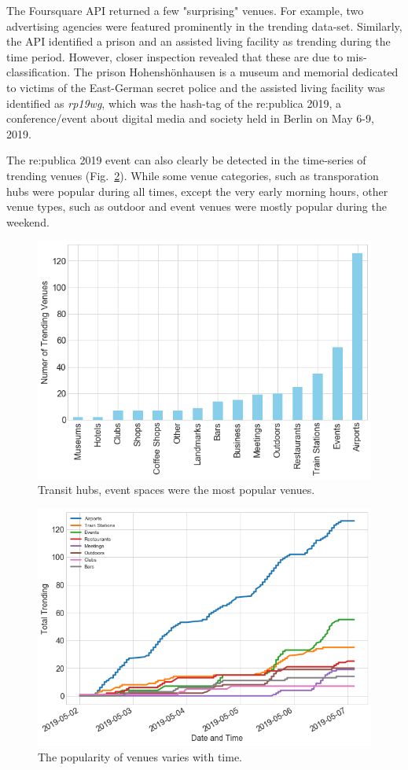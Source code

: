 \documentclass[letter]{scrartcl}
\begin{document}
The Foursquare API returned a few "surprising" venues. For example, two advertising agencies were featured prominently in the trending data-set. Similarly, the API identified a prison and an assisted living facility as trending during the time period. However, closer inspection revealed that these are due to mis-classification. The prison Hohensh\"onhausen is a museum and memorial dedicated to victims of the East-German secret police and the assisted living facility was identified as \emph{rp19wg}, which was the hash-tag of the re:publica 2019, a conference/event about digital media and society held in Berlin on May 6-9, 2019. 

The re:publica 2019 event can also clearly be detected in the time-series of trending venues (Fig.~\ref{fig:TrendingVT}). While some venue categories, such as transporation hubs were popular during all times, except the very early morning hours, other venue types, such as outdoor and event venues were mostly popular during the weekend.

\begin{figure}[h!]
\centering
\includegraphics[width=12cm]{../Figures/TrendingVenues.PNG}
\caption{Transit hubs, event spaces were the most popular venues.}\label{fig:TrendingV}
\end{figure}

\begin{figure}[h!]
\centering
\includegraphics[width=12cm]{../Figures/TrendingTime.PNG}
\caption{The popularity of venues varies with time.}\label{fig:TrendingVT}
\end{figure}
\clearpage
\end{document}
